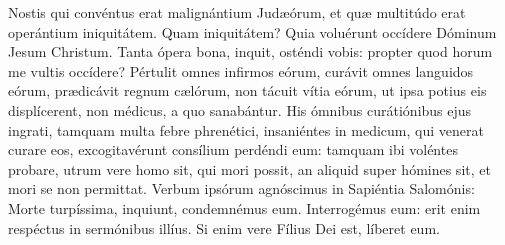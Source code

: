 
Nostis qui convéntus erat malignántium Judæórum, et quæ multitúdo erat operántium iniquitátem. Quam iniquitátem? Quia voluérunt occídere Dóminum Jesum Christum. Tanta ópera bona, inquit, osténdi vobis: propter quod horum me vultis occídere? Pértulit omnes infirmos eórum, curávit omnes languidos eórum, prædicávit regnum cælórum, non tácuit vítia eórum, ut ipsa potius eis displícerent, non médicus, a quo sanabántur. His ómnibus curátiónibus ejus ingrati, tamquam multa febre phrenétici, insaniéntes in medicum, qui venerat curare eos, excogitavérunt consílium perdéndi eum: tamquam ibi voléntes probare, utrum vere homo sit, qui mori possit, an aliquid super hómines sit, et mori se non permittat. Verbum ipsórum agnóscimus in Sapiéntia Salomónis: Morte turpíssima, inquiunt, condemnémus eum. Interrogémus eum: erit enim respéctus in sermónibus illíus. Si enim vere Fílius Dei est, líberet eum.
\par